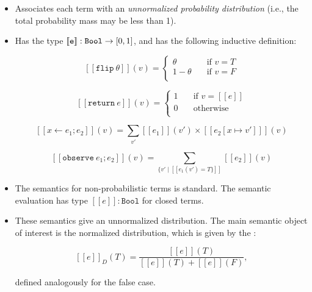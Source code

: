 \documentclass{tufte-handout}
\begin{document}
\begin{itemize}
\item Associates each term with an \emph{unnormalized probability distribution} 
(i.e., the total probability mass may be less than 1).
\item Has the type $\left \llbracket {\texttt{e}} \right \rrbracket : \texttt{Bool} \rightarrow [0, 1]$,
and has the following inductive definition:

$$
[\![\texttt{flip}~\theta]\!](v) = 
\begin{cases}
\theta& \quad \text{if }v = T\\
1-\theta& \quad \text{if }v = F\\
\end{cases}
$$

$$
 [\![\texttt{return}~e]\!](v) = 
 \begin{cases}
 1\quad& \text{if }v = [\![e]\!]\\
 0\quad&  \text{otherwise}\\
 \end{cases}
$$

$$
[\![x \leftarrow e_1; e_2]\!](v) = \sum_{v'} [\![{e_1}]\!](v') \times [\![{e_2[x \mapsto v']}]\!](v)
$$

$$
[\![\texttt{observe}~e_1; e_2]\!](v) = 
\sum_{\{v' \mid [\![{e_1}(v') = T\}]\!]} [\![{e_2}]\!](v)
$$

\item The semantics for non-probabilistic terms is standard. The semantic evaluation has type 
$[[e]]: \texttt{Bool}$ for closed terms.

\item These semantics give an unnormalized distribution. The main semantic object of interest is 
the normalized distribution, which is given by the :

$$
[\![e]\!]_D(T) = \frac{[\![e]\!](T)}{[\![e]\!](T) + [\![e]\!](F) },
$$

defined analogously for the false case.
\end{itemize}

\end{document}

